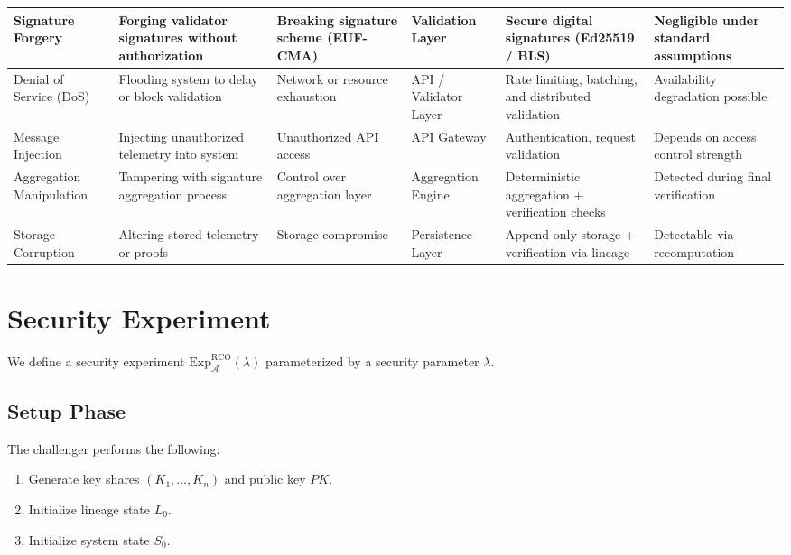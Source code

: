 \begin{table}[htbp]
\begin{tabularx}{\textwidth}{|p{2.8cm}|X|p{2.5cm}|X|X|p{2.2cm}|}
\hline

Signature Forgery & Forging validator signatures without authorization & Breaking signature scheme (EUF-CMA) & Validation Layer & Secure digital signatures (Ed25519 / BLS) & Negligible under standard assumptions \\

\hline

Denial of Service (DoS) & Flooding system to delay or block validation & Network or resource exhaustion & API / Validator Layer & Rate limiting, batching, and distributed validation & Availability degradation possible \\

\hline

Message Injection & Injecting unauthorized telemetry into system & Unauthorized API access & API Gateway & Authentication, request validation & Depends on access control strength \\

\hline

Aggregation Manipulation & Tampering with signature aggregation process & Control over aggregation layer & Aggregation Engine & Deterministic aggregation + verification checks & Detected during final verification \\

\hline

Storage Corruption & Altering stored telemetry or proofs & Storage compromise & Persistence Layer & Append-only storage + verification via lineage & Detectable via recomputation \\

\hline

\end{tabularx}
\end{table}

\section{Security Experiment}

We define a security experiment $\text{Exp}_{\mathcal{A}}^{\text{RCO}}(\lambda)$ parameterized by a security parameter $\lambda$.

\subsection{Setup Phase}

The challenger performs the following:

\begin{enumerate}
\item Generate key shares $(K_1, \dots, K_n)$ and public key $PK$.
\item Initialize lineage state $L_0$.
\item Initialize system state $S_0$.
\end{enumerate}


